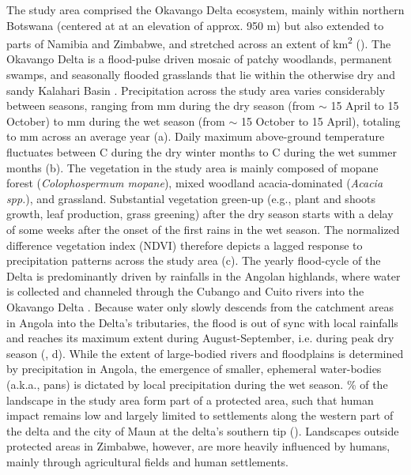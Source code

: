 \documentclass[abstract=on,10pt,a4paper,bibliography=totocnumbered]{article}
\newcommand{\inputy}[1]{\unskip}
\begin{document}
The study area comprised the Okavango Delta ecosystem, mainly within northern
Botswana (centered at \inputy{GeneralMetrics/StudyAreaCenter.tex} at an
elevation of approx. 950 m) but also extended to parts of Namibia and Zimbabwe,
and stretched across an extent of \inputy{GeneralMetrics/SizeStudyArea.tex}
km\textsuperscript{2} (). The Okavango Delta is a flood-pulse
driven mosaic of patchy woodlands, permanent swamps, and seasonally flooded
grasslands that lie within the otherwise dry and sandy Kalahari Basin
\citep{Wilson.1976, Ramberg.2006, Mendelsohn.2010}. Precipitation across the
study area varies considerably between seasons, ranging from
\inputy{GeneralMetrics/MinimumPrecipitation.tex} mm during the dry season (from
$\sim$ 15 April to 15 October) to
\inputy{GeneralMetrics/MaximumPrecipitation.tex} mm during the wet season (from
$\sim$ 15 October to 15 April), totaling to
\inputy{GeneralMetrics/TotalPrecipitation.tex} mm across an average year
(a). Daily maximum above-ground temperature fluctuates between
\inputy{GeneralMetrics/MinimumTemperature.tex}\degree C during the dry winter
months to \inputy{GeneralMetrics/MaximumTemperature.tex}\degree C during the wet
summer months (b). The vegetation in the study area is mainly
composed of mopane forest (\textit{Colophospermum mopane}), mixed woodland
acacia-dominated (\textit{Acacia spp.}), and grassland. Substantial vegetation
green-up (e.g., plant and shoots growth, leaf production, grass greening) after
the dry season starts with a delay of some weeks after the onset of the first
rains in the wet season. The normalized difference vegetation index (NDVI)
therefore depicts a lagged response to precipitation patterns across the study
area (c). The yearly flood-cycle of the Delta is predominantly
driven by rainfalls in the Angolan highlands, where water is collected and
channeled through the Cubango and Cuito rivers into the Okavango Delta
\citep{McCarthy.2003, Gumbricht.2004, Mendelsohn.2010}. Because water only
slowly descends from the catchment areas in Angola into the Delta's tributaries,
the flood is out of sync with local rainfalls and reaches its maximum extent
during August-September, i.e. during peak dry season (\citealp{Wolski.2017},
d). While the extent of large-bodied rivers and floodplains is
determined by precipitation in Angola, the emergence of smaller, ephemeral
water-bodies (a.k.a., pans) is dictated by local precipitation during the wet
season. \inputy{GeneralMetrics/PercentageProtected.tex}\% of the landscape in
the study area form part of a protected area, such that human impact remains low
and largely limited to settlements along the western part of the delta and the
city of Maun at the delta's southern tip (). Landscapes outside
protected areas in Zimbabwe, however, are more heavily influenced by humans,
mainly through agricultural fields and human settlements.
\end{document}
